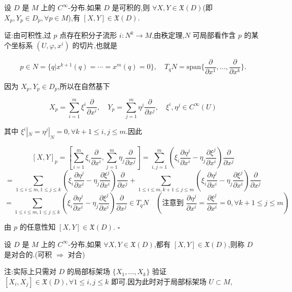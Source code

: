 \begin{proposition}
设 $D$ 是 $M$ 上的 $C^\infty$-分布.如果 $D$ 是可积的,则 $\forall X, Y \in \mathfrak{X}(D)$(即 $X_p, Y_p \in D_p, \forall p \in M$),有 $[X,Y] \in \mathfrak{X}(D)$.
\end{proposition}

证:由可积性,过 $p$ 点存在积分子流形 $i: N^k \to M$,由秩定理,$N$ 可局部看作含 $p$ 的某个坐标系 $(U,\varphi,x^i)$ 的切片,也就是

\[
p \in N = \{q|x^{k+1}(q) = \cdots = x^m(q) = 0\}, \quad T_qN = \text{span}\{\frac{\partial}{\partial x^1},\ldots,\frac{\partial}{\partial x^k}\}.
\]

因为 $X_p, Y_p \in D_p$,所以在自然基下

\[
X_p = \sum_{i=1}^m \xi^i \frac{\partial}{\partial x^i}, \quad Y_p = \sum_{j=1}^m \eta^j \frac{\partial}{\partial x^j}, \quad \xi^i, \eta^j \in C^\infty(U)
\]

其中 $\xi^i|_N = \eta^j|_N = 0, \forall k + 1 \leq i, j \leq m$.因此

\[
[X,Y]_p = [\sum_{i=1}^m \xi_i \frac{\partial}{\partial x^i}, \sum_{j=1}^m \eta_j \frac{\partial}{\partial x^j}] = \sum_{i,j=1}^m \left( \xi_i \frac{\partial \eta^j}{\partial x^i} - \eta_j \frac{\partial \xi^j}{\partial x^i} \right) \frac{\partial}{\partial x^j} 
\]
\[
= \sum_{1 \leq i \leq m, 1 \leq j \leq k} \left( \xi_i \frac{\partial \eta^j}{\partial x^i} - \eta_j \frac{\partial \xi^j}{\partial x^i} \right) \frac{\partial}{\partial x^j} + \sum_{1 \leq i \leq m, k+1 \leq j \leq m} \left( \xi_i \frac{\partial \eta^j}{\partial x^i} - \eta_j \frac{\partial \xi^j}{\partial x^i} \right) \frac{\partial}{\partial x^j}
\]
\[
= \sum_{1 \leq i \leq m, 1 \leq j \leq k} \left( \xi_i \frac{\partial \eta^j}{\partial x^i} - \eta_j \frac{\partial \xi^j}{\partial x^i} \right) \frac{\partial}{\partial x^j} \in T_qN \quad (\text{注意到 } \frac{\partial \eta^j}{\partial x^i} = \frac{\partial \xi^j}{\partial x^i} = 0, \forall k + 1 \leq j \leq m)
\]

由 $p$ 的任意性知 $[X,Y] \in \mathfrak{X}(D)$. $\square$

\begin{definition}
设 $D$ 是 $M$ 上的 $C^\infty$-分布,如果 $\forall X, Y \in \mathfrak{X}(D)$,都有 $[X,Y] \in \mathfrak{X}(D)$,则称 $D$ 是对合的.(可积 $\Rightarrow$ 对合)
\end{definition}

注:实际上只需对 $D$ 的局部标架场 $\{X_1,\ldots,X_k\}$ 验证 $[X_i,X_j] \in \mathfrak{X}(D), \forall 1 \leq i, j \leq k$ 即可.因为此时对于局部标架场 $U \subset M$,

